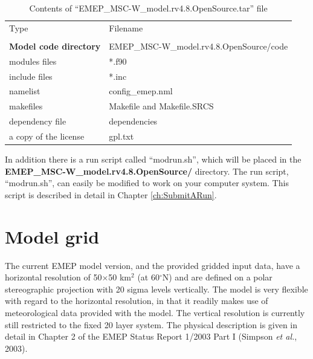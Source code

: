 \documentclass[a4paper,12pt]{report}
\begin{document}
\begin{table}[h]
\begin{center}
\caption{Contents of ``EMEP\_MSC-W\_model.rv4.8.OpenSource.tar'' file
   \label{Tab:modelfiles}}
\begin{tabular}{ll}
& \\
\hline
Type      & Filename          \\
\hline
& \\
{\bf Model code directory} & EMEP\_MSC-W\_model.rv4.8.OpenSource/code \\ 
\hline
modules files & *.f90 \\
include files & *.inc \\
namelist & config\_emep.nml \\
makefiles & Makefile and Makefile.SRCS \\
dependency file &  dependencies\\
a copy of the license & gpl.txt \\
\hline
\end{tabular}
\end{center}
\end{table}

In addition there is a run script called ``modrun.sh'', which will be placed 
in the \\{\bf EMEP\_MSC-W\_model.rv4.8.OpenSource/}  directory. The run 
script, ``modrun.sh'', can easily be modified to work on your computer system. 
This script is described in detail in Chapter \ref{ch:SubmitARun}. 
 


\section{Model grid}
\label{sec:ModelGrid}

The current EMEP model version, and the provided gridded input data,
have a horizontal resolution of 50$\times$50 km$^2$ (at 60$^\circ$N)
and are defined on a
polar stereographic projection with 20 sigma levels vertically. 
The model is very flexible with regard to the horizontal
resolution, in that it readily makes use of 
meteorological data provided with the model. The vertical
resolution is currently still restricted to the fixed 20 layer
system. The physical
description is given in detail in Chapter 2 of the EMEP Status Report
1/2003 Part I (Simpson {\sl et al.}, 2003).
\end{document}
